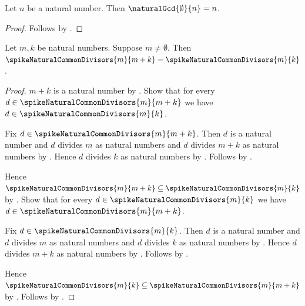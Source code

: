 \begin{corollary}\label{spike15_natural_gcd_zero_left}
    Let $n$ be a natural number.
    Then $\naturalGcd{\emptyset}{n}=n$.
\end{corollary}
\begin{proof}
    Follows by
        .
\end{proof}

\begin{theorem}\label{spike15_common_divisors_subtract_sum}
    Let $m,k$ be natural numbers.
    Suppose $m\neq\emptyset$.
    Then $\spikeNaturalCommonDivisors{m}{m+k}
        =\spikeNaturalCommonDivisors{m}{k}$.
\end{theorem}
\begin{proof}
    $m+k$ is a natural number by .
    Show that for every
        $d\in\spikeNaturalCommonDivisors{m}{m+k}$ we have
        $d\in\spikeNaturalCommonDivisors{m}{k}$.
    \begin{subproof}
        Fix $d\in\spikeNaturalCommonDivisors{m}{m+k}$.
        Then $d$ is a natural number and
            $d$ divides $m$ as natural numbers and
            $d$ divides $m+k$ as natural numbers
            by .
        Hence $d$ divides $k$ as natural numbers
            by .
        Follows by
            .
    \end{subproof}
    Hence $\spikeNaturalCommonDivisors{m}{m+k}
        \subseteq\spikeNaturalCommonDivisors{m}{k}$
        by .
    Show that for every
        $d\in\spikeNaturalCommonDivisors{m}{k}$ we have
        $d\in\spikeNaturalCommonDivisors{m}{m+k}$.
    \begin{subproof}
        Fix $d\in\spikeNaturalCommonDivisors{m}{k}$.
        Then $d$ is a natural number and
            $d$ divides $m$ as natural numbers and
            $d$ divides $k$ as natural numbers
            by .
        Hence $d$ divides $m+k$ as natural numbers
            by .
        Follows by
            .
    \end{subproof}
    Hence $\spikeNaturalCommonDivisors{m}{k}
        \subseteq\spikeNaturalCommonDivisors{m}{m+k}$
        by .
    Follows by .
\end{proof}

